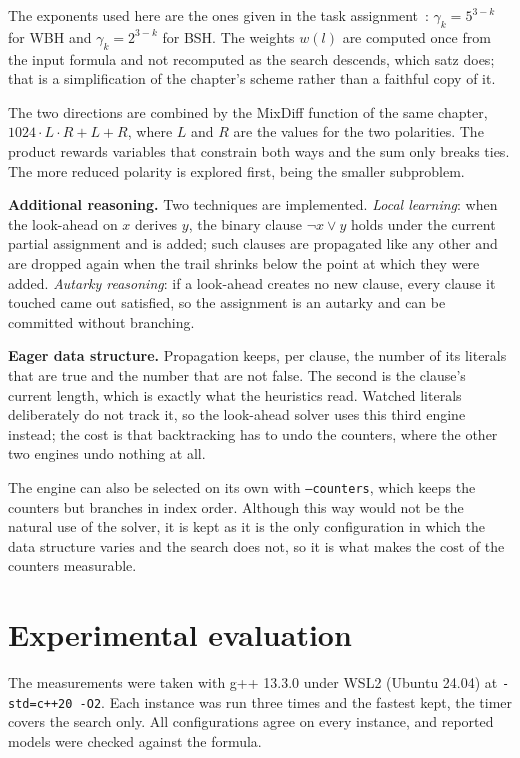 \documentclass[11pt,a4paper]{article}
\begin{document}
The exponents used here are the ones given in the task
assignment~\cite{taskpage}: $\gamma_k = 5^{3-k}$ for WBH and
$\gamma_k = 2^{3-k}$ for BSH. The weights $w(l)$ are computed once from the
input formula and not recomputed as the search descends, which satz does; that
is a simplification of the chapter's scheme rather than a faithful copy of
it.

The two directions are combined by the MixDiff function of the same chapter,
$1024 \cdot L \cdot R + L + R$, where $L$ and $R$ are the values for the two
polarities. The product rewards variables that constrain both ways and the sum
only breaks ties. The more reduced polarity is explored first, being the
smaller subproblem.

\textbf{Additional reasoning.} Two techniques are implemented. \emph{Local
learning}: when the look-ahead on $x$ derives $y$, the binary clause
$\lnot x \vee y$ holds under the current partial assignment and is added; such
clauses are propagated like any other and are dropped again when the trail
shrinks below the point at which they were added. \emph{Autarky reasoning}: if
a look-ahead creates no new clause, every clause it touched came out satisfied,
so the assignment is an autarky and can be committed without branching.

\textbf{Eager data structure.} Propagation keeps, per clause, the number of its
literals that are true and the number that are not false. The second is the
clause's current length, which is exactly what the heuristics read. Watched
literals deliberately do not track it, so the look-ahead solver uses this third
engine instead; the cost is that backtracking has to undo the counters, where
the other two engines undo nothing at all.

The engine can also be selected on its own with \texttt{--counters}, which
keeps the counters but branches in index order. Although this way would not be the
natural use of the solver, it is kept as it is the only configuration in which
the data structure varies and the search does not, so it is what makes the
cost of the counters measurable.

\section{Experimental evaluation}

The measurements were taken with g++ 13.3.0 under WSL2 (Ubuntu 24.04) at
\texttt{-std=c++20 -O2}. Each instance was run three times and the fastest
kept, the timer covers the search only. All configurations agree on every
instance, and reported models were checked against the formula.
\end{document}
